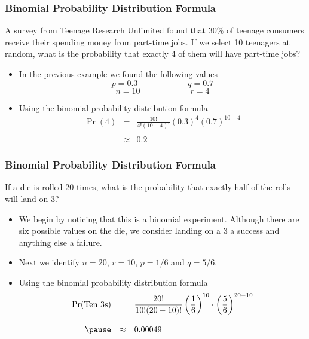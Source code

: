 \documentclass{beamer}
\theoremstyle{definition}
\begin{document}
\begin{frame}
\frametitle{Binomial Probability Distribution Formula}\pause
\begin{example}
A survey from Teenage Research Unlimited found that $30 \%$ of
teenage consumers receive their spending money from part-time jobs.
If we select 10 teenagers at random, what is the probability that exactly 4 of them will have part-time jobs?
\end{example}
\begin{itemize}
\item In the previous example we found the following values
$$p=0.3\qquad\qquad\qquad q=0.7$$
$$n=10\qquad\qquad\qquad r=4$$\pause
\vspace*{-.1in}
\item Using the binomial probability distribution formula
$$\begin{array}{rcl}
\displaystyle \Pr(4)
&=&\displaystyle\frac{10!}{4!(10-4)!}(0.3)^4(0.7)^{10-4}\\ \\
&\approx&\displaystyle 0.2
\end{array}$$
\end{itemize}
\end{frame}

\begin{frame}
\frametitle{Binomial Probability Distribution Formula}\pause
\begin{example}
If a die is rolled 20 times, what is the probability that exactly half of the rolls will land on 3?
\end{example}\pause
\begin{itemize}
\item We begin by noticing that this is a binomial experiment.  Although there are six possible values on the die, we consider landing on a 3 a success and anything else a failure.\pause
\item Next we identify $n=20$, $r=10$, $p=1/6$ and $q=5/6$.\pause
\item Using the binomial probability distribution formula
$$\begin{array}{rcl}
\displaystyle \Pr(\text{Ten 3s})
&=&\displaystyle\frac{20!}{10!(20-10)!}\left(\frac{1}{6}\right)^{10}\cdot\left(\frac{5}{6}\right)^{20-10}\\ \\ \pause
&\approx&0.00049
\end{array}$$
\end{itemize}
\end{frame}
\end{document}
